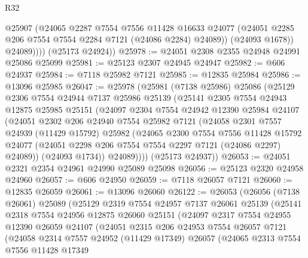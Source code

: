 \begin{lexlean}{R32}
\begin{coremodule}
                @25907
                (@24065
                  @2287
                  @7554
                  @7556
                  @11428
                  @16633
                  @24077
                  (@24051 @2285 @206 @7554 @7554 @2284 @7121 (@24086 @2284) @24089))
                (@24093 @1678))
              @24089))))
      (@25173 @24924))
@25978 := @24051 @2308 @2355 @24948 @24991 @25086 @25099
@25981 := @25123 @2307 @24945 @24947
@25982 := @606 @24937
@25984 := @7118 @25982 @7121
@25985 := @12835 @25984
@25986 := @13096 @25985
@26047 := @25978
    (@25981
      (@7138 @25986)
      @25086
      (@25129
        @2306
        @7554
        @24944
        @7137
        @25986
        @25139
        (@25141
          @2305
          @7554
          @24943
          @12875
          @25985
          @25151
          (@24097
            @2304
            @7554
            @24942
            @12390
            @25984
            @24107
            (@24051
              @2302
              @206
              @24940
              @7554
              @25982
              @7121
              (@24058
                @2301
                @7557
                @24939
                (@11429 @15792)
                @25982
                (@24065
                  @2300
                  @7554
                  @7556
                  @11428
                  @15792
                  @24077
                  (@24051 @2298 @206 @7554 @7554 @2297 @7121 (@24086 @2297) @24089))
                (@24093 @1734))
              @24089))))
      (@25173 @24937))
@26053 := @24051 @2321 @2354 @24961 @24990 @25089 @25098
@26056 := @25123 @2320 @24958 @24960
@26057 := @606 @24950
@26059 := @7118 @26057 @7121
@26060 := @12835 @26059
@26061 := @13096 @26060
@26122 := @26053
    (@26056
      (@7138 @26061)
      @25089
      (@25129
        @2319
        @7554
        @24957
        @7137
        @26061
        @25139
        (@25141
          @2318
          @7554
          @24956
          @12875
          @26060
          @25151
          (@24097
            @2317
            @7554
            @24955
            @12390
            @26059
            @24107
            (@24051
              @2315
              @206
              @24953
              @7554
              @26057
              @7121
              (@24058
                @2314
                @7557
                @24952
                (@11429 @17349)
                @26057
                (@24065
                  @2313
                  @7554
                  @7556
                  @11428
                  @17349

\end{coremodule}
\end{lexlean}
